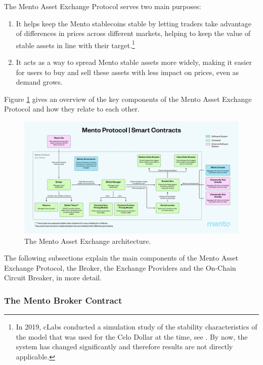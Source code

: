 \documentclass[a4paper]{article}
\theoremstyle{definition}
\begin{document}
The Mento Asset Exchange Protocol serves two main purposes: 
\begin{enumerate}
    \item It helps keep the Mento stablecoins stable by letting traders take advantage of differences in prices across different markets, helping to keep the value of stable assets in line with their target.\footnote{In 2019, cLabs conducted a simulation study of the stability characteristics of the model that was used for the Celo Dollar at the time, see \cite{cLabs2019Stability}. By now, the system has changed significantly and therefore results are not directly applicable.}
    \item  It acts as a way to spread Mento stable assets more widely, making it easier for users to buy and sell these assets with less impact on prices, even as demand grows.
\end{enumerate}


Figure \ref{fig:mento_asset_exchange} gives an overview of the key components of the Mento Asset Exchange Protocol and how they relate to each other. 

\begin{figure}[ht]
    \centering
    \includegraphics[width=1.0\linewidth]{figures/mento_asset_exchange.png}
    \caption{The Mento Asset Exchange architecture.}
    \label{fig:mento_asset_exchange}
\end{figure}

The following subsections explain the main components of the Mento Asset Exchange Protocol, the Broker, the Exchange Providers and the On-Chain Circuit Breaker, in more detail.

\subsubsection{The Mento Broker Contract}
\end{document}
